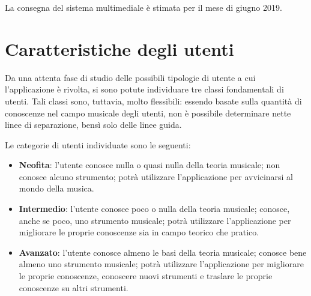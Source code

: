 La consegna del sistema multimediale è stimata per il mese di giugno 2019.

\section{Caratteristiche degli utenti}
Da una attenta fase di studio delle possibili tipologie di utente a cui l'applicazione è rivolta, si sono potute individuare tre classi fondamentali di utenti. Tali classi sono, tuttavia, molto flessibili: essendo basate sulla quantità di conoscenze nel campo musicale degli utenti, non è possibile determinare nette linee di separazione, bensì solo delle linee guida.

Le categorie di utenti individuate sono le seguenti:
\begin{itemize}
	\item \textbf{Neofita}: l'utente conosce nulla o quasi nulla della teoria musicale; non conosce alcuno strumento; potrà utilizzare l'applicazione per avvicinarsi al mondo della musica.
	\item \textbf{Intermedio}: l'utente conosce poco o nulla della teoria musicale; conosce, anche se poco, uno strumento musicale; potrà utilizzare l'applicazione per migliorare le proprie conoscenze sia in campo teorico che pratico.
	\item \textbf{Avanzato}: l'utente conosce almeno le basi della teoria musicale; conosce bene almeno uno strumento musicale; potrà utilizzare l'applicazione per migliorare le proprie conoscenze, conoscere nuovi strumenti e traslare le proprie conoscenze su altri strumenti.
\end{itemize}

